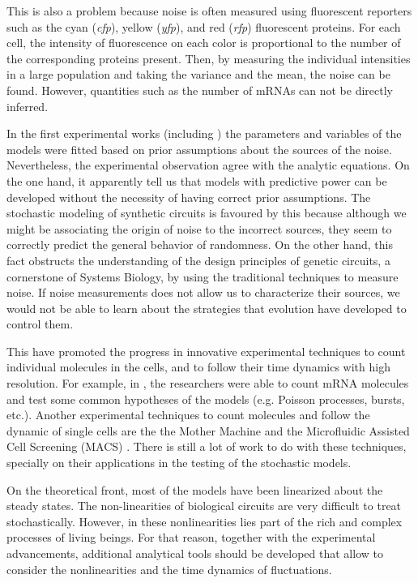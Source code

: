 This is also a problem because noise is often measured using fluorescent reporters such as the cyan (\textit{cfp}), yellow (\textit{yfp}), and red (\textit{rfp}) fluorescent proteins. For each cell, the intensity of fluorescence on each color is proportional to the number of the corresponding proteins present. Then, by measuring the individual intensities in a large population and taking the variance and the mean, the noise can be found. However, quantities such as the number of mRNAs can not be directly inferred.

In the first experimental works (including \cite{pedraza05}) the parameters and variables of the models were fitted based on prior assumptions about the sources of the noise. Nevertheless, the experimental observation agree with the analytic equations. On the one hand, it apparently tell us that models with predictive power can be developed without the necessity of having correct prior assumptions. The stochastic modeling of synthetic circuits is favoured by this because although we might be associating the origin of noise to the incorrect sources, they seem to correctly predict the general behavior of randomness. On the other hand, this fact obstructs the understanding of the design principles of genetic circuits, a cornerstone of Systems Biology, by using the traditional techniques to measure noise. If noise measurements does not allow us to characterize their sources, we would not be able to learn about the strategies that evolution have developed to control them.

This have promoted the progress in innovative experimental techniques to count individual molecules in the cells, and to follow their time dynamics with high resolution. For example, in \cite{golding05}, the researchers were able to count mRNA molecules and test some common hypotheses of the models (e.g. Poisson processes, bursts, etc.). Another experimental techniques to count molecules and follow the dynamic of single cells are the the Mother Machine \cite{wang10} and the Microfluidic Assisted Cell Screening (MACS) \cite{okumus13}. There is still a lot of work to do with these techniques, specially on their applications in the testing of the stochastic models.

On the theoretical front, most of the models have been linearized about the steady states. The non-linearities of biological circuits are very difficult to treat stochastically. However, in these nonlinearities lies part of the rich and complex processes of living beings. For that reason, together with the experimental advancements, additional analytical tools should be developed that allow to consider the nonlinearities and the time dynamics of fluctuations.

